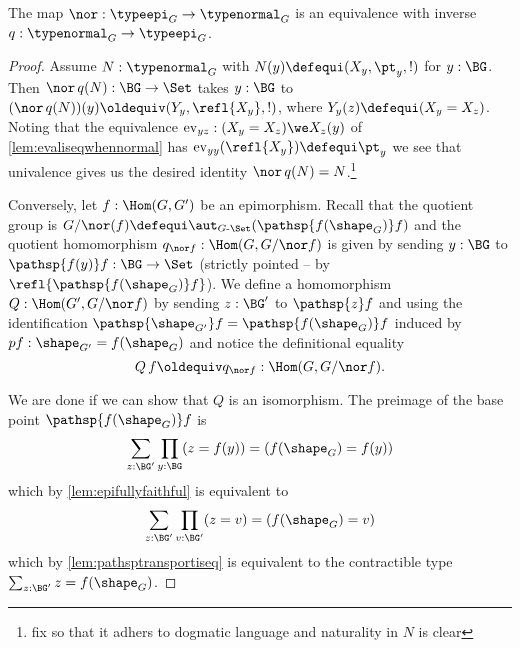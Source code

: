 \begin{lemma}
  \label{lem:qeq}
  The map $\nor:\typeepi_G\to\typenormal_G$ is an equivalence with inverse $q:\typenormal_G\to\typeepi_G$.
\end{lemma}
\begin{proof}
  Assume $N:\typenormal_G$ with $N(y)\defequi(X_y,\pt_y,!)$ for $y:\BG$.
  Then $\nor\, q(N):\BG\to\Set$ takes $y:\BG$ to $(\nor\, q(N))(y)\oldequiv(Y_y,\refl{X_y},!)$, where $Y_y(z)\defequi (X_y=X_z)$.
  Noting that the equivalence $\mathrm{ev}_{yz}:(X_y=X_z)\we X_z(y)$ of \cref{lem:evaliseqwhennormal} has $\mathrm{ev}_{yy}(\refl{X_y})\defequi \pt_y$ we see that univalence gives us the desired identity $\nor\, q(N)=N$.\footnote{fix so that it adhers to dogmatic language and naturality in $N$ is clear}

  Conversely, let $f:\Hom(G,G')$ be an epimorphism.
  Recall that the quotient group is $G/\nor(f)\defequi\aut_{G\text{-}\Set}(\pathsp{f(\shape_G)}f)$ and the quotient homomorphism $q_{\nor f}:\Hom(G,G/\nor f)$ is given by sending $y:\BG$ to $\pathsp{f(y)}f:\BG\to\Set$ (strictly pointed -- \ie by $\refl{\pathsp{f(\shape_G)}f}$).
  We define a homomorphism $Q:\Hom(G',G/\nor f)$ by sending $z:\BG'$ to $\pathsp{z}f$ and using the identification $\pathsp{\shape_{G'}}f=\pathsp{f(\shape_G)}f$ induced by $pf:\shape_{G'}=f(\shape_G)$ and notice the definitional equality
  $$Q\,f\oldequiv q_{\nor f}:\Hom(G,G/\nor f).$$

We are done if we can show that $Q$ is an isomorphism.
The preimage of the base point $\pathsp{f(\shape_G)}f$ is
$$\sum_{z:\BG'}\prod_{y:\BG}(z=f(y))=(f(\shape_G)=f(y))$$
which by
\cref{lem:epifullyfaithful} is equivalent to
$$\sum_{z:\BG'}\prod_{v:\BG'}(z=v)=(f(\shape_G)=v)$$
which by \cref{lem:pathsptransportiseq} is equivalent to the contractible type $\sum_{z:\BG'}z=f(\shape_G)$.
\end{proof}

